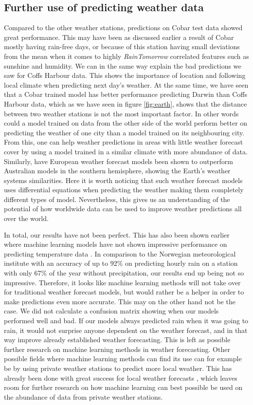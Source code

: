 \documentclass[11pt]{article}
\begin{document}
\subsection{Further use of predicting weather data}
Compared to the other weather stations, predictions on Cobar test data showed great performance. This may have been as discussed earlier a result of Cobar mostly having rain-free days, or because of this station having small deviations from the mean when it comes to highly \textit{RainTomorrow} correlated features such as sunshine and humidity. We can in the same way explain the bad predictions we saw for Coffs Harbour data. This shows the importance of location and following local climate when predicting next day's weather.
At the same time, we have seen that a Cobar trained model has better performance predicting Darwin than Coffs Harbour data, which as we have seen in figure \ref{fig:earth}, shows that the distance between two weather stations is not the most important factor. In other words could a model trained on data from the other side of the world perform better on predicting the weather of one city than a model trained on its neighbouring city. From this, one can help weather predictions in areas with little weather forecast cover by using a model trained in a similar climate with more abundance of data. Similarly, have European weather forecast models been shown to outperform Australian models in the southern hemisphere\cite{australian_model}, showing the Earth's weather systems similarities. Here it is worth noticing that such weather forecast models uses differential equations when predicting the weather making them completely different types of model. Nevertheless, this gives us an understanding of the potential of how worldwide data can be used to improve weather predictions all over the world.

In total, our results have not been perfect. This has also been shown earlier where machine learning models have not shown impressive performance on predicting temperature data \cite{forecast}. In comparison to the Norwegian meteorological institute with an accuracy of up to 92\% \cite{nettavisen}\cite{yr} on predicting hourly rain on a station with only 67\% of the year without precipitation\cite{klima}, our results end up being not so impressive. Therefore, it looks like machine learning methods will not take over for traditional weather forecast models, but would rather be a helper in order to make predictions even more accurate. This may on the other hand not be the case. We did not calculate a confusion matrix showing when our models performed well and bad. If our models always predicted rain when it was going to rain, it would not surprise anyone dependent on the weather forecast, and in that way improve already established weather forecasting. This is left as possible further research on machine learning methods in weather forecasting. Other possible fields where machine learning methods can find its use can for example be by using private weather stations to predict more local weather. This has already been done with great success for local weather forecasts \cite{yr}, which leaves room for further research on how machine learning can best possible be used on the abundance of data from private weather stations.
\end{document}
